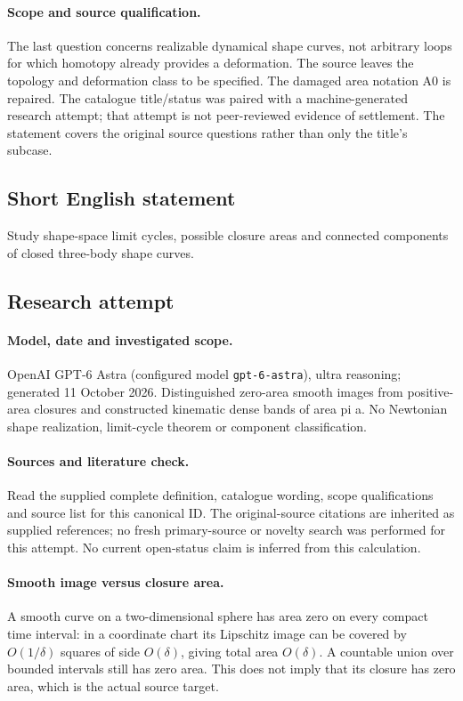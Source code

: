 \documentclass[11pt]{article}
\begin{document}
\paragraph{Scope and source qualification.}The last question concerns realizable dynamical shape curves, not arbitrary loops for which homotopy already provides a deformation. The source leaves the topology and deformation class to be specified. The damaged area notation A0 is repaired. The catalogue title/status was paired with a machine-generated research attempt; that attempt is not peer-reviewed evidence of settlement. The statement covers the original source questions rather than only the title’s subcase.
\subsection{Short English statement}
Study shape-space limit cycles, possible closure areas and connected components of closed three-body shape curves.
\subsection{Research attempt}
\paragraph{Model, date and investigated scope.}
OpenAI GPT-6 Astra (configured model \texttt{gpt-6-astra}), ultra reasoning; generated 11 October 2026. Distinguished zero-area smooth images from positive-area closures and constructed kinematic dense bands of area pi a. No Newtonian shape realization, limit-cycle theorem or component classification.

\paragraph{Sources and literature check.}
Read the supplied complete definition, catalogue wording, scope qualifications and source list for this canonical ID. The original-source citations are inherited as supplied references; no fresh primary-source or novelty search was performed for this attempt. No current open-status claim is inferred from this calculation.

\paragraph{Smooth image versus closure area.}A smooth curve on a two-dimensional sphere has area zero on every compact time interval: in a coordinate chart its Lipschitz image can be covered by \(O(1/\delta)\) squares of side \(O(\delta)\), giving total area \(O(\delta)\). A countable union over bounded intervals still has zero area. This does not imply that its closure has zero area, which is the actual source target.
\end{document}

